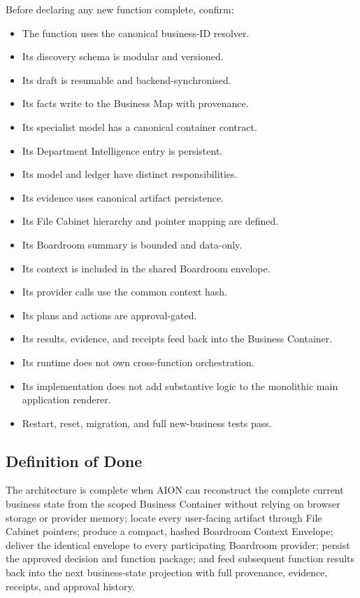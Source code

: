 Before declaring any new function complete, confirm:

\begin{itemize}
  \item[$\square$] The function uses the canonical business-ID resolver.
  \item[$\square$] Its discovery schema is modular and versioned.
  \item[$\square$] Its draft is resumable and backend-synchronised.
  \item[$\square$] Its facts write to the Business Map with provenance.
  \item[$\square$] Its specialist model has a canonical container contract.
  \item[$\square$] Its Department Intelligence entry is persistent.
  \item[$\square$] Its model and ledger have distinct responsibilities.
  \item[$\square$] Its evidence uses canonical artifact persistence.
  \item[$\square$] Its File Cabinet hierarchy and pointer mapping are defined.
  \item[$\square$] Its Boardroom summary is bounded and data-only.
  \item[$\square$] Its context is included in the shared Boardroom envelope.
  \item[$\square$] Its provider calls use the common context hash.
  \item[$\square$] Its plans and actions are approval-gated.
  \item[$\square$] Its results, evidence, and receipts feed back into the
  Business Container.
  \item[$\square$] Its runtime does not own cross-function orchestration.
  \item[$\square$] Its implementation does not add substantive logic to the
  monolithic main application renderer.
  \item[$\square$] Restart, reset, migration, and full new-business tests pass.
\end{itemize}

\subsection{Definition of Done}

The architecture is complete when AION can reconstruct the complete current
business state from the scoped Business Container without relying on browser
storage or provider memory; locate every user-facing artifact through File
Cabinet pointers; produce a compact, hashed Boardroom Context Envelope; deliver
the identical envelope to every participating Boardroom provider; persist the
approved decision and function package; and feed subsequent function results back
into the next business-state projection with full provenance, evidence, receipts,
and approval history.
